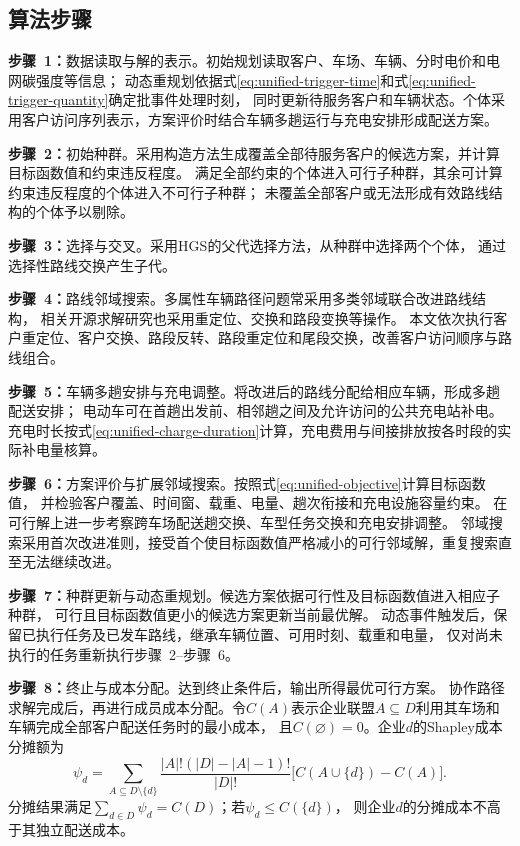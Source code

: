 \documentclass{setp-new}
\begin{document}
\subsection{算法步骤}

\textbf{步骤~1：}数据读取与解的表示。初始规划读取客户、车场、车辆、分时电价和电网碳强度等信息；
动态重规划依据式\eqref{eq:unified-trigger-time}和式\eqref{eq:unified-trigger-quantity}确定批事件处理时刻，
同时更新待服务客户和车辆状态。个体采用客户访问序列表示，方案评价时结合车辆多趟运行与充电安排形成配送方案。

\textbf{步骤~2：}初始种群。采用构造方法生成覆盖全部待服务客户的候选方案，并计算目标函数值和约束违反程度。
满足全部约束的个体进入可行子种群，其余可计算约束违反程度的个体进入不可行子种群；
未覆盖全部客户或无法形成有效路线结构的个体予以剔除。

\textbf{步骤~3：}选择与交叉。采用HGS的父代选择方法，从种群中选择两个个体，
通过选择性路线交换产生子代\cite{ref:76}。

\textbf{步骤~4：}路线邻域搜索。多属性车辆路径问题常采用多类邻域联合改进路线结构\cite{ref:77}，
相关开源求解研究也采用重定位、交换和路段变换等操作\cite{ref:64}。
本文依次执行客户重定位、客户交换、路段反转、路段重定位和尾段交换，改善客户访问顺序与路线组合。

\textbf{步骤~5：}车辆多趟安排与充电调整。将改进后的路线分配给相应车辆，形成多趟配送安排；
电动车可在首趟出发前、相邻趟之间及允许访问的公共充电站补电。
充电时长按式\eqref{eq:unified-charge-duration}计算，充电费用与间接排放按各时段的实际补电量核算。

\textbf{步骤~6：}方案评价与扩展邻域搜索。按照式\eqref{eq:unified-objective}计算目标函数值，
并检验客户覆盖、时间窗、载重、电量、趟次衔接和充电设施容量约束。
在可行解上进一步考察跨车场配送趟交换、车型任务交换和充电安排调整。
邻域搜索采用首次改进准则，接受首个使目标函数值严格减小的可行邻域解，重复搜索直至无法继续改进。

\textbf{步骤~7：}种群更新与动态重规划。候选方案依据可行性及目标函数值进入相应子种群，
可行且目标函数值更小的候选方案更新当前最优解。
动态事件触发后，保留已执行任务及已发车路线，继承车辆位置、可用时刻、载重和电量，
仅对尚未执行的任务重新执行步骤~2--步骤~6。

\textbf{步骤~8：}终止与成本分配。达到终止条件后，输出所得最优可行方案。
协作路径求解完成后，再进行成员成本分配。令$C(A)$表示企业联盟$A\subseteq D$利用其车场和车辆完成全部客户配送任务时的最小成本，
且$C(\varnothing)=0$。企业$d$的Shapley成本分摊额为\cite{ref:91}
\begin{equation}
\psi_d=\sum_{A\subseteq D\setminus\{d\}}
\frac{|A|!(|D|-|A|-1)!}{|D|!}
\bigl[C(A\cup\{d\})-C(A)\bigr].
\label{eq:shapley-cost}
\end{equation}
分摊结果满足$\sum_{d\in D}\psi_d=C(D)$；若$\psi_d\le C(\{d\})$，
则企业$d$的分摊成本不高于其独立配送成本。
\end{document}
